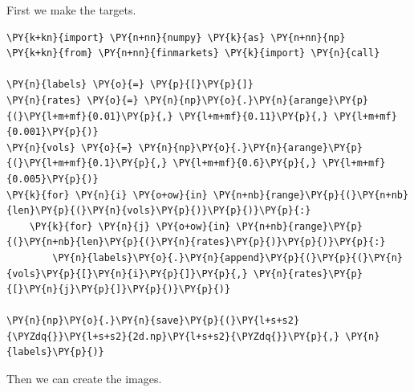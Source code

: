 First we make the targets.

\begin{codebox}[breakable, size=fbox, boxrule=1pt, pad at break*=1mm,colback=cellbackground, colframe=cellborder]
\begin{Verbatim}[commandchars=\\\{\}]
\PY{k+kn}{import} \PY{n+nn}{numpy} \PY{k}{as} \PY{n+nn}{np}
\PY{k+kn}{from} \PY{n+nn}{finmarkets} \PY{k}{import} \PY{n}{call}
	
\PY{n}{labels} \PY{o}{=} \PY{p}{[}\PY{p}{]}
\PY{n}{rates} \PY{o}{=} \PY{n}{np}\PY{o}{.}\PY{n}{arange}\PY{p}{(}\PY{l+m+mf}{0.01}\PY{p}{,} \PY{l+m+mf}{0.11}\PY{p}{,} \PY{l+m+mf}{0.001}\PY{p}{)}
\PY{n}{vols} \PY{o}{=} \PY{n}{np}\PY{o}{.}\PY{n}{arange}\PY{p}{(}\PY{l+m+mf}{0.1}\PY{p}{,} \PY{l+m+mf}{0.6}\PY{p}{,} \PY{l+m+mf}{0.005}\PY{p}{)}
\PY{k}{for} \PY{n}{i} \PY{o+ow}{in} \PY{n+nb}{range}\PY{p}{(}\PY{n+nb}{len}\PY{p}{(}\PY{n}{vols}\PY{p}{)}\PY{p}{)}\PY{p}{:}
    \PY{k}{for} \PY{n}{j} \PY{o+ow}{in} \PY{n+nb}{range}\PY{p}{(}\PY{n+nb}{len}\PY{p}{(}\PY{n}{rates}\PY{p}{)}\PY{p}{)}\PY{p}{:}
        \PY{n}{labels}\PY{o}{.}\PY{n}{append}\PY{p}{(}\PY{p}{(}\PY{n}{vols}\PY{p}{[}\PY{n}{i}\PY{p}{]}\PY{p}{,} \PY{n}{rates}\PY{p}{[}\PY{n}{j}\PY{p}{]}\PY{p}{)}\PY{p}{)} 
	
\PY{n}{np}\PY{o}{.}\PY{n}{save}\PY{p}{(}\PY{l+s+s2}{\PYZdq{}}\PY{l+s+s2}{2d.np}\PY{l+s+s2}{\PYZdq{}}\PY{p}{,} \PY{n}{labels}\PY{p}{)}
\end{Verbatim}
\end{codebox}

Then we can create the images.

